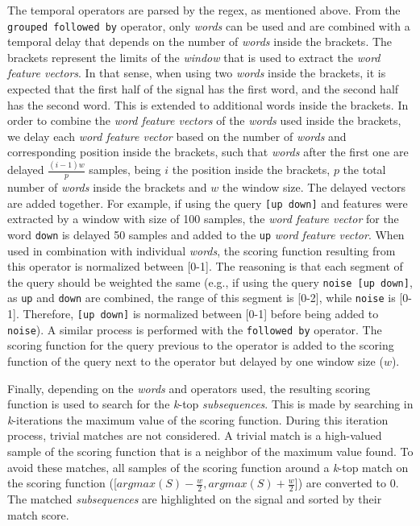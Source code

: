 The temporal operators are parsed by the \gls{regex}, as mentioned above. From the \texttt{grouped followed by} operator, only \textit{words} can be used and are combined with a temporal delay that depends on the number of \textit{words} inside the brackets. The brackets represent the limits of the \textit{window} that is used to extract the \textit{word feature vectors}. In that sense, when using two \textit{words} inside the brackets, it is expected that the first half of the signal has the first word, and the second half has the second word. This is extended to additional words inside the brackets. In order to combine the \textit{word feature vectors} of the \textit{words} used inside the brackets, we delay each \textit{word feature vector} based on the number of \textit{words} and corresponding position inside the brackets, such that \textit{words} after the first one are delayed $\frac{(i-1)w}{p}$ samples, being $i$ the position inside the brackets, $p$ the total number of \textit{words} inside the brackets and $w$ the window size. The delayed vectors are added together. For example, if using the query \texttt{[up down]} and features were extracted by a window with size of 100 samples, the \textit{word feature vector} for the word \texttt{down} is delayed 50 samples and added to the \texttt{up} \textit{word feature vector}. When used in combination with individual \textit{words}, the scoring function resulting from this operator is normalized between [0-1]. The reasoning is that each segment of the query should be weighted the same (e.g., if using the query \texttt{noise [up down]}, as \texttt{up} and \texttt{down} are combined, the range of this segment is [0-2], while \texttt{noise} is [0-1]. Therefore, \texttt{[up down]} is normalized between [0-1] before being added to \texttt{noise}). A similar process is performed with the \texttt{followed by} operator. The scoring function for the query previous to the operator is added to the scoring function of the query next to the operator but delayed by one window size ($w$).
\par
Finally, depending on the \textit{words} and operators used, the resulting scoring function is used to search for the \textit{k}-top \textit{subsequences}. This is made by searching in \textit{k}-iterations the maximum value of the scoring function. During this iteration process, trivial matches are not considered. A trivial match is a high-valued sample of the scoring function that is a neighbor of the maximum value found. To avoid these matches, all samples of the scoring function around a \textit{k}-top match on the scoring function ([$argmax(S)-\frac{w}{2}, argmax(S)+\frac{w}{2}$]) are converted to $0$. The matched \textit{subsequences} are highlighted on the signal and sorted by their match score.